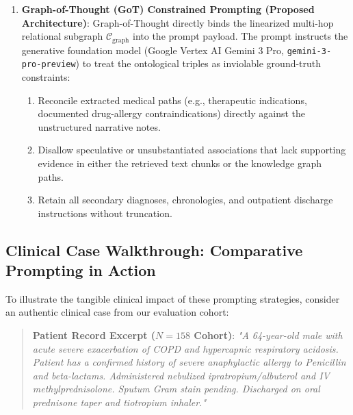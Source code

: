 \documentclass[11pt, a4paper]{article}
\begin{document}
\begin{enumerate}
  \item \textbf{Graph-of-Thought (GoT) Constrained Prompting (Proposed Architecture)}: Graph-of-Thought directly binds the linearized multi-hop relational subgraph $\mathcal{C}_{\text{graph}}$ into the prompt payload. The prompt instructs the generative foundation model (Google Vertex AI Gemini 3 Pro, \texttt{gemini-3-pro-preview}) to treat the ontological triples as inviolable ground-truth constraints:
  \begin{enumerate}
    \item Reconcile extracted medical paths (e.g., therapeutic indications, documented drug-allergy contraindications) directly against the unstructured narrative notes.
    \item Disallow speculative or unsubstantiated associations that lack supporting evidence in either the retrieved text chunks or the knowledge graph paths.
    \item Retain all secondary diagnoses, chronologies, and outpatient discharge instructions without truncation.
  \end{enumerate}
\end{enumerate}

\subsection{Clinical Case Walkthrough: Comparative Prompting in Action}
To illustrate the tangible clinical impact of these prompting strategies, consider an authentic clinical case from our evaluation cohort:
\begin{quote}
  \small
  \textbf{Patient Record Excerpt ($N = 158$ Cohort)}: \textit{"A 64-year-old male with acute severe exacerbation of COPD and hypercapnic respiratory acidosis. Patient has a confirmed history of severe anaphylactic allergy to Penicillin and beta-lactams. Administered nebulized ipratropium/albuterol and IV methylprednisolone. Sputum Gram stain pending. Discharged on oral prednisone taper and tiotropium inhaler."}
\end{quote}
\end{document}
